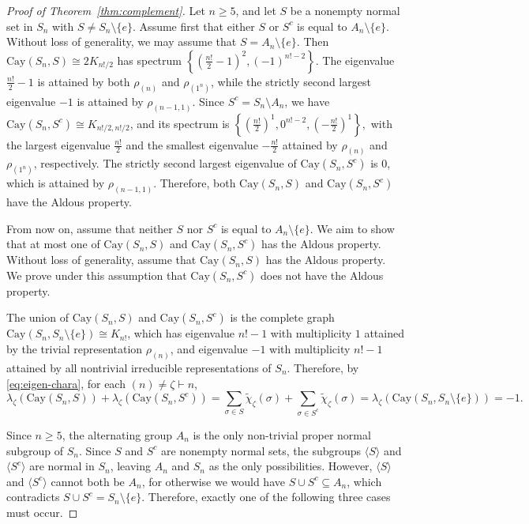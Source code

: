 \documentclass[12pt, a4paper]{article}
\theoremstyle{definition}
\begin{document}
 
\begin{proof}[Proof of Theorem~\ref{thm:complement}]
Let $n \geq 5$, and let $S$ be a nonempty normal set in $S_n$ with $S\neq S_n\setminus\{e\}$. Assume first that either $S$ or $S^c$ is equal to $A_n\setminus\{e\}$. Without loss of generality, we may assume that $S=A_n\setminus\{e\}$.
Then $\mathrm{Cay}(S_n,S)\cong 2K_{n!/2}$ has spectrum
\(
\left\{\left(\frac{n!}{2}-1\right)^2,(-1)^{n!-2}\right\}.
\)
The eigenvalue $\frac{n!}{2}-1$ is attained by both $\rho_{(n)}$ and $\rho_{(1^n)}$, while the strictly second largest eigenvalue $-1$ is attained by $\rho_{(n-1,1)}$. Since $S^c=S_n\setminus A_n$, we have $\mathrm{Cay}(S_n,S^c)\cong K_{n!/2,n!/2}$, and its spectrum is
\(
\left\{\left(\frac{n!}{2}\right)^1,0^{n!-2},\left(-\frac{n!}{2}\right)^1\right\},
\)
with the largest eigenvalue $\frac{n!}{2}$ and the smallest eigenvalue $-\frac{n!}{2}$ attained by $\rho_{(n)}$ and $\rho_{(1^n)}$, respectively. The strictly second largest eigenvalue of $\mathrm{Cay}(S_n,S^c)$ is $0$, which is attained by $\rho_{(n-1,1)}$.
Therefore, both $\mathrm{Cay}(S_n,S)$ and $\mathrm{Cay}(S_n,S^c)$ have the Aldous property.

From now on, assume that neither $S$ nor $S^c$ is equal to $A_n\setminus\{e\}$. We aim to show that at most one of $\mathrm{Cay}(S_n, S)$ and $\mathrm{Cay}(S_n, S^c)$ has the Aldous property. Without loss of generality, assume that $\mathrm{Cay}(S_n,S)$ has the Aldous property. We prove under this assumption that $\mathrm{Cay}(S_n,S^c)$ does not have the Aldous property.

The union of $\mathrm{Cay}(S_n,S)$ and $\mathrm{Cay}(S_n,S^c)$ is the complete graph $\mathrm{Cay}(S_n,S_n\setminus\{e\}) \cong K_{n!}$, which has eigenvalue $n!-1$ with multiplicity $1$ attained by the trivial representation $\rho_{(n)}$, and eigenvalue $-1$ with multiplicity $n!-1$ attained by all nontrivial irreducible representations of $S_n$. Therefore, by \eqref{eq:eigen-chara}, for each $(n)\ne\zeta\vdash n$,
\begin{equation}\label{complement-sum}
\lambda_{\zeta}(\mathrm{Cay}(S_n,S)) + \lambda_{\zeta}(\mathrm{Cay}(S_n,S^c))
=
\sum_{\sigma\in S}\tilde{\chi}_{\zeta}(\sigma)+\sum_{\sigma\in S^c}\tilde{\chi}_{\zeta}(\sigma)
=
\lambda_{\zeta}(\mathrm{Cay}(S_n,S_n\setminus\{e\}))
=-1.
\end{equation}

Since $n \ge 5$, the alternating group $A_n$ is the only non-trivial proper normal subgroup of $S_n$. Since $S$ and $S^c$ are nonempty normal sets, the subgroups $\langle S \rangle$ and $\langle S^c \rangle$ are normal in $S_n$, leaving $A_n$ and $S_n$ as the only possibilities. However, $\langle S \rangle$ and $\langle S^c \rangle$ cannot both be $A_n$, for otherwise we would have $S \cup S^c \subseteq A_n$, which contradicts $S \cup S^c = S_n \setminus \{e\}$. Therefore, exactly one of the following three cases must occur.


\end{proof}
\end{document}
